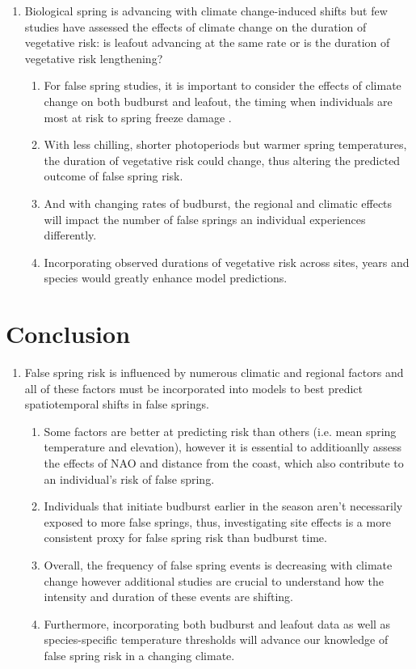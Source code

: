\documentclass{article}\usepackage[]{graphicx}\usepackage[]{color}
\begin{document}
\begin{enumerate}
\item Biological spring is advancing with climate change-induced shifts but few studies have assessed the effects of climate change on the duration of vegetative risk: is leafout advancing at the same rate or is the duration of vegetative risk lengthening?
  \begin{enumerate}
  \item For false spring studies, it is important to consider the effects of climate change on both budburst and leafout, the timing when individuals are most at risk to spring freeze damage \citep{Lenz2016}.
  \item With less chilling, shorter photoperiods but warmer spring temperatures, the duration of vegetative risk could change, thus altering the predicted outcome of false spring risk.
  \item And with changing rates of budburst, the regional and climatic effects will impact the number of false springs an individual experiences differently.
  \item Incorporating observed durations of vegetative risk across sites, years and species would greatly enhance model predictions. 
  \end{enumerate}
\end{enumerate}
  
\section*{Conclusion}
\begin{enumerate}
\item False spring risk is influenced by numerous climatic and regional factors and all of these factors must be incorporated into models to best predict spatiotemporal shifts in false springs.
  \begin{enumerate}
  \item Some factors are better at predicting risk than others (i.e. mean spring temperature and elevation), however it is essential to additioanlly assess the effects of NAO and distance from the coast, which also contribute to an individual's risk of false spring. 
  \item Individuals that initiate budburst earlier in the season aren't necessarily exposed to more false springs, thus, investigating site effects is a more consistent proxy for false spring risk than budburst time. 
  \item Overall, the frequency of false spring events is decreasing with climate change however additional studies are crucial to understand how the intensity and duration of these events are shifting.
  \item Furthermore, incorporating both budburst and leafout data as well as species-specific temperature thresholds will advance our knowledge of false spring risk in a changing climate. 
  \end{enumerate}
\end{enumerate}
  
\end{document}
